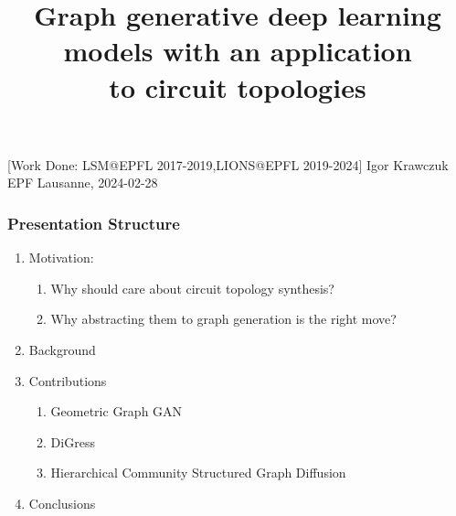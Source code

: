 \documentclass[11pt,xcolor={dvipsnames},hyperref={pdftex,pdfpagemode=UseNone,hidelinks,pdfdisplaydoctitle=true},usepdftitle=false]{beamer}
\begin{document}
\title{\justifying Graph generative deep learning models with an application\\ to circuit topologies}
\information%
[Work Done: LSM@EPFL 2017-2019,LIONS@EPFL 2019-2024]%
{Igor Krawczuk}%
{EPF Lausanne,  2024-02-28}
\frame[label=title]{\titlepage}

\begin{frame}[label=done]
  \frametitle{Presentation Structure}
  \centering
  \begin{enumerate}
    \item Motivation:
      \begin{enumerate}
        \item Why should care about circuit topology synthesis?
        \item Why abstracting them to graph generation is the right move?
      \end{enumerate}
    \item Background %
    \item Contributions
      \begin{enumerate}
        \item Geometric Graph GAN
        \item DiGress
        \item Hierarchical Community Structured Graph Diffusion
      \end{enumerate}
    \item Conclusions %
  \end{enumerate} 
  \vspace{1cm} %
\end{frame}





\end{document}
